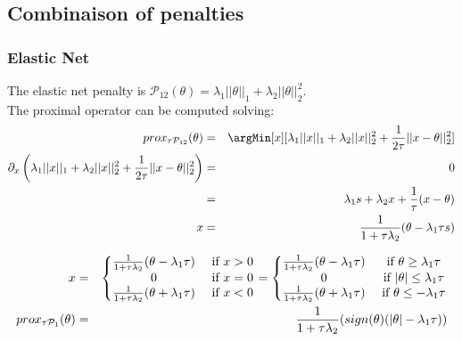 \documentclass{article}
\begin{document}
\boxResult{
\[prox_{\tau \mathcal{P}_N}(\theta) = U diag(sign(\sigma_\theta)(|\sigma_\theta|-\lambda_N\tau)^+ \trans{V} \]
}

\subsection{Combinaison of penalties}
\label{sec:org65e550e}
\subsubsection{Elastic Net}
\label{sec:org02a150e}
The elastic net penalty is $\mathcal{P}_{12}(\theta)=\lambda_1||\theta||_1 + \lambda_2 ||\theta||^2_2$. \\

The proximal operator can be computed solving:
\begin{eqnarray*}
prox_{\tau \mathcal{P}_{12}}(\theta) &=& \argMin[x][\lambda_1||x||_1 + \lambda_2 ||x||^2_2+\frac{1}{2\tau} ||x-\theta||_2^2] \\
\partial_x\left(\lambda_1||x||_1 + \lambda_2 ||x||^2_2+\frac{1}{2 \tau} ||x-\theta||_2^2 \right) 
       &=& 0 \\
       &=& \lambda_1 s+\lambda_2 x+\frac{1}{\tau} (x-\theta) \\
     x &=& \frac{1}{1+\tau\lambda_2} (\theta - \lambda_1 \tau s)
\end{eqnarray*}
		
\begin{eqnarray}
x &=& \left\{ \begin{matrix}
\frac{1}{1+\tau\lambda_2}(\theta - \lambda_1 \tau) &\text{ if } x>0  \\
0 & \text{ if } x=0  \\
\frac{1}{1+\tau\lambda_2}(\theta + \lambda_1 \tau) &\text{ if } x<0  \\
\end{matrix}  \right. 
= \left\{ \begin{matrix}
\frac{1}{1+\tau\lambda_2}(\theta - \lambda_1 \tau) &\text{ if } \theta\geq\lambda_1\tau  \\
0 & \text{ if } |\theta|\leq\lambda_1\tau  \\
\frac{1}{1+\tau\lambda_2}(\theta + \lambda_1 \tau) &\text{ if } \theta\leq-\lambda_1\tau  \\
\end{matrix}  \right. \notag \\
prox_{\tau \mathcal{P}_1}(\theta) &=& \frac{1}{1+\tau\lambda_2}(sign(\theta)(|\theta|-\lambda_1\tau)) \\
\end{eqnarray}
		
\end{document}
